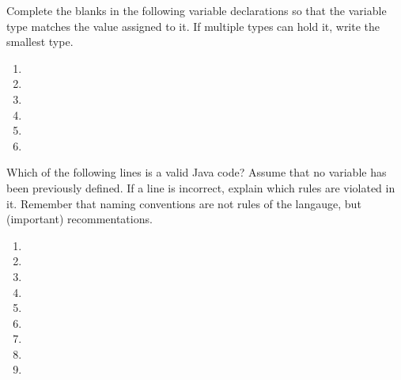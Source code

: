 
\exercisesection

\begin{exercise}
Complete the blanks in the following variable declarations so that the variable type matches the value assigned to it. If multiple types can hold it, write the smallest type. 
\begin{enumerate}
\item {}
\item {}
\item {}
\item {}
\item {}
\item {}
\end{enumerate}
\end{exercise}

\begin{exercise}
Which of the following lines is a valid Java code? Assume that no variable has been previously defined. If a line is incorrect, explain which rules are violated in it. Remember that naming conventions are not rules of the langauge, but (important) recommentations.
\begin{enumerate}
\item {}
\item {}
\item {}
\item {}
\item {}
\item {}
\item {}
\item {}
\item {}
\end{enumerate}
\end{exercise}

